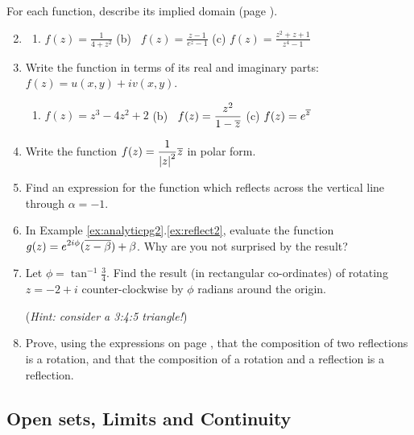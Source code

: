 \begin{exercises*}
	\exstart For each function, describe its implied domain (page \pageref{sec:func}).
	\begin{enumerate}\setcounter{enumi}{1}
	  \item[]\begin{enumerate}
	    \item $\displaystyle f(z)=\frac 1{4+z^2}$\qquad
	    (b) \ $\displaystyle f(z)=\frac{z-1}{e^z-1}$\qquad
	    (c) $\displaystyle f(z)=\frac{z^2+z+1}{z^4-1}$
	  \end{enumerate}
	  
	  \item Write the function in terms of its real and imaginary parts: $f(z)=u(x,y)+iv(x,y)$.
	  \begin{enumerate}
	  	\item $\displaystyle f(z)=z^3-4z^2+2$\qquad
	    (b) \ $\displaystyle f(z)=\frac{z^2}{1-\overline{z}}$\qquad
	    (c) $\displaystyle f(z)=e^{\overline{z}}$
	  \end{enumerate}
	  
	  \item Write the function $\displaystyle f(z)=\frac 1{\left| z\right|^2}\overline{z}$ in polar form.
	  
	  \item Find an expression for the function which reflects across the vertical line through $\alpha=-1$.
	  
	  \item In Example \ref*{ex:analyticpg2}.\ref{ex:reflect2}, evaluate the function $\displaystyle g(z)=e^{2i\phi}(\overline{z-\beta})+\beta$. Why are you not surprised by the result?
	  
	  \item Let $\phi=\tan^{-1}\frac 34$. Find the result (in rectangular co-ordinates) of rotating $z=-2+i$ counter-clockwise by $\phi$ radians around the origin.\par
	  (\emph{Hint: consider a 3:4:5 triangle!})
	  
	  \item Prove, using the expressions on page \pageref{pg:2dgeom}, that the composition of two reflections is a rotation, and that the composition of a rotation and a reflection is a reflection.
	\end{enumerate}
\end{exercises*}
\clearpage



\subsection{Open sets, Limits and Continuity}


